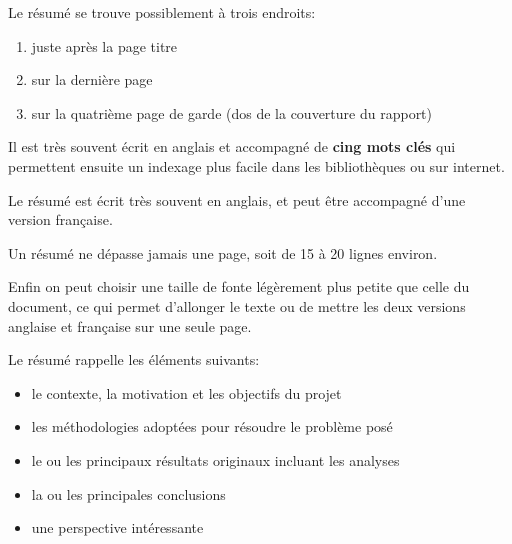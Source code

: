 


Le résumé se trouve possiblement à trois endroits:
\begin{enumerate}
	\item  juste après la page titre
	\item  sur la dernière page
	\item  sur la quatrième page de garde (dos de la couverture du rapport)
\end{enumerate}


Il est très souvent écrit en anglais et accompagné de \textbf{cing mots clés}
qui permettent ensuite un indexage plus facile dans les bibliothèques ou sur internet.

Le résumé  est écrit très souvent en anglais, et 
peut être  accompagné d'une version française.

Un résumé ne dépasse jamais une page, soit de 15 à 20 lignes environ.

Enfin on peut choisir une taille de fonte légèrement plus petite que celle
du document, ce qui permet d'allonger le texte ou de mettre les deux versions
anglaise et française sur une seule page.


Le résumé rappelle les éléments suivants:

\begin{itemize}
\item le contexte, la motivation et les objectifs du projet
\item les méthodologies adoptées pour résoudre le problème posé
\item le ou les principaux résultats originaux incluant les analyses
\item la ou les principales conclusions
\item une perspective intéressante
\end{itemize}


 